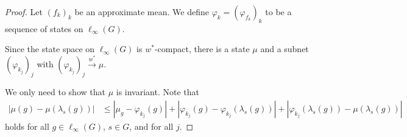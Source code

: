 \documentclass[10pt]{mypackage}
\begin{document}
\begin{proof}
  Let $\left(f_k\right)_k$ be an approximate mean. We define $\varphi_k = \left(\varphi_{f_k}\right)_k$ to be a sequence of states on $\ell_{\infty}\left(G\right)$.\newline

  Since the state space on $\ell_{\infty}\left(G\right)$ is $w^{\ast}$-compact, there is a state $\mu$ and a subnet $\left(\varphi_{k_j}\right)_{j}$ with $\left(\varphi_{k_j}\right)_{j}\xrightarrow{w^{\ast}}\mu$.\newline

  We only need to show that $\mu$ is invariant. Note that
  \begin{align*}
    \left\vert \mu\left(g\right) - \mu\left(\lambda_s\left(g\right)\right) \right\vert &\leq \left\vert \mu_{g} - \varphi_{k_j}\left(g\right) \right\vert + \left\vert \varphi_{k_j}\left(g\right) - \varphi_{k_j}\left(\lambda_s\left(g\right)\right) \right\vert + \left\vert \varphi_{k_j}\left(\lambda_{s}\left(g\right)\right) - \mu\left(\lambda_{s}\left(g\right)\right) \right\vert
  \end{align*}
  holds for all $g\in \ell_{\infty}\left(G\right)$, $s\in G$, and for all $j$.\newline


\end{proof}
\end{document}
